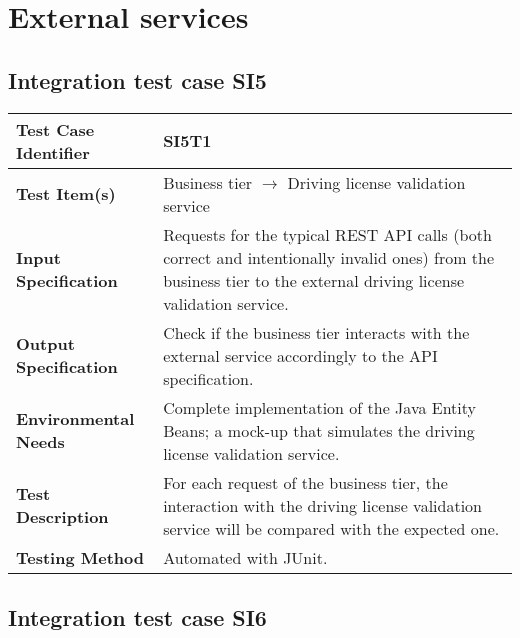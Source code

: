 \section{External services}
\subsection{Integration test case SI5}

\begin{tabular}{l p{}}
    \hline
    \textbf{Test Case Identifier} & SI5T1\\
    \hline
    \textbf{Test Item(s)} & Business tier $\rightarrow$ Driving license validation service\\
    \hline
    \textbf{Input Specification} & Requests for the typical REST API calls (both correct and intentionally invalid ones) from the business tier to the external driving license validation service.\\
    \hline
    \textbf{Output Specification} & Check if the business tier interacts with the external service accordingly to the API specification.\\
    \hline
    \textbf{Environmental Needs} & Complete implementation of the Java Entity Beans; a mock-up that simulates the driving license validation service. \\
    \hline
    \textbf{Test Description} & For each request of the business tier, the interaction with the driving license validation service will be compared with the expected one.\\
    \hline
    \textbf{Testing Method} & Automated with JUnit.\\
    \hline
\end{tabular}

\vspace{2em}

\subsection{Integration test case SI6}
\label{sec:performance-business}

